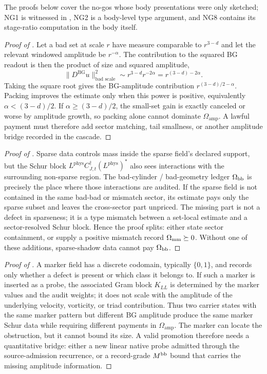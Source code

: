 \documentclass[11pt]{article}
\newcommand{\DBG}{D^{\mathrm{BG}}}
\newcommand{\Lphys}{L^{\mathrm{phys}}}
\newcommand{\Omamp}{\Omega_{\mathrm{amp}}}
\theoremstyle{definition}
\begin{document}
The proofs below cover the no-gos whose body presentations were only
sketched; NG1 is witnessed in , NG2 is a body-level
type argument, and NG8 contains its stage-ratio computation in the
body itself.

\begin{proof}[Proof of ]
Let a bad set at scale \(r\) have measure comparable to \(r^{3-d}\)
and let the relevant windowed amplitude be \(r^{-\alpha}\).  The
contribution to the squared BG readout is then the product of size and
squared amplitude,
\[
  \|\DBG u\|^2_{\text{bad scale}}
  \sim r^{3-d} r^{-2\alpha}
  = r^{(3-d)-2\alpha}.
\]
Taking the square root gives the BG-amplitude contribution
\(r^{(3-d)/2-\alpha}\).  Packing improves the estimate only when this
power is positive, equivalently \(\alpha<(3-d)/2\).  If
\(\alpha\ge (3-d)/2\), the small-set gain is exactly canceled or worse
by amplitude growth, so packing alone cannot dominate \(\Omamp\).  A
lawful payment must therefore add sector matching, tail smallness, or
another amplitude bridge recorded in the cascade.
\end{proof}

\begin{proof}[Proof of ]
Sparse data controls mass inside the sparse field's declared support,
but the Schur block \(\Lphys C_{J,t}^{\dagger}(\Lphys)^*\) also sees
interactions with the surrounding non-sparse region.  The bad-cylinder /
bad-geometry ledger \(\Omega_{\rm bb}\) is precisely the place where
those interactions are audited.  If the sparse field is not contained
in the same bad-bad or mismatch sector, its estimate pays only the
sparse subset and leaves the cross-sector part unpriced.  The missing
part is not a defect in sparseness; it is a type mismatch between a
set-local estimate and a sector-resolved Schur block.  Hence the proof
splits: either state sector containment, or supply a positive mismatch
record \(\Omega_{\rm mm}\succeq 0\).  Without one of these additions,
sparse-shadow data cannot pay \(\Omega_{\rm bb}\).
\end{proof}

\begin{proof}[Proof of ]
A marker field has a discrete codomain, typically \(\{0,1\}\), and
records only whether a defect is present or which class it belongs to.
If such a marker is inserted as a probe, the associated Gram block
\(K_{LL}\) is determined by the marker values and the audit weights;
it does not scale with the amplitude of the underlying velocity,
vorticity, or triad contribution.  Thus two carrier states with the
same marker pattern but different BG amplitude produce the same marker
Schur data while requiring different payments in \(\Omamp\).  The
marker can locate the obstruction, but it cannot bound its size.  A
valid promotion therefore needs a quantitative bridge: either a new
linear native probe admitted through the source-admission recurrence,
or a record-grade \(M^{\rm bb}\) bound that carries the missing
amplitude information.
\end{proof}
\end{document}
